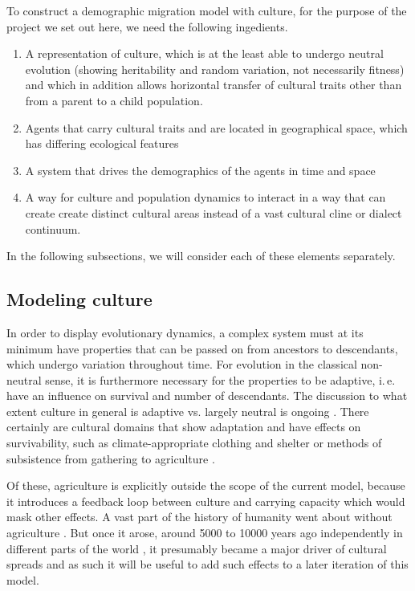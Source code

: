 \documentclass[a4paper,12pt]{scrartcl}
\begin{document}
To construct a demographic migration model with culture, for the purpose of the
project we set out here, we need the following ingedients.
\begin{enumerate}
\item A representation of culture, which is at the least able to undergo neutral
  evolution (showing heritability and random variation, not necessarily
  fitness) and which in addition allows horizontal transfer of cultural traits
  other than from a parent to a child population.
\item Agents that carry cultural traits and are located in geographical space,
  which has differing ecological features
\item A system that drives the demographics of the agents in time and space
\item A way for culture and population dynamics to interact in a way that can
  create create distinct cultural areas instead of a vast cultural cline or
  dialect continuum.
\end{enumerate}

In the following subsections, we will consider each of these elements
separately.

\subsection{Modeling culture}
\label{s:culture}
In order to display evolutionary dynamics, a complex system must at its minimum
have properties that can be passed on from ancestors to descendants, which
undergo variation throughout time. For evolution in the classical non-neutral
sense, it is furthermore necessary for the properties to be adaptive, i.\,e.
have an influence on survival and number of descendants. The discussion to what
extent culture in general is adaptive vs. largely neutral is ongoing
\parencite{}. There certainly are cultural domains that show adaptation and have
effects on survivability, such as climate-appropriate clothing and shelter
\parencite{} or methods of subsistence from gathering to agriculture
\parencite{}. 

Of these, agriculture is explicitly outside the scope of the
current model, because it introduces a feedback loop between culture and
carrying capacity which would mask other effects. A vast part of the
history of humanity went about without agriculture \parencite{}. But once it
arose, around 5000 to 10000 years ago independently in different parts of the
world \parencite{}, it presumably became a major driver of cultural spreads
\parencite{farming/language dispersal hypothesis} and as such it will be useful
to add such effects to a later iteration of this model.
\end{document}
